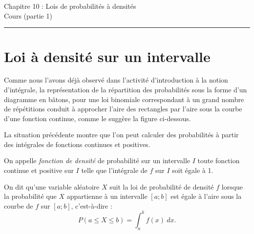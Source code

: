 



 
\chead{} 
\cfoot{}
\renewcommand{\headrulewidth}{0pt}
\renewcommand{\footrulewidth}{0pt}

 \Huge Chapitre 10 : Lois de probabilités à densités\\
 \normalsize Cours (partie 1)\\
 
 \hrule
 
 \vspace{0.5cm}

\section{Loi à densité sur un
intervalle}\label{loi-uxe0-densituxe9-sur-un-intervalle}

Comme nous l'avons déjà observé dans l'activité d'introduction à la
notion d'intégrale, la représentation de la répartition des probabilités
sous la forme d'un diagramme en bâtons, pour une loi binomiale
correspondant à un grand nombre de répétitions conduit à approcher
l'aire des rectangles par l'aire sous la courbe d'une fonction continue,
comme le suggère la figure ci-dessous.

La situation précédente montre que l'on peut calculer des probabilités à
partir des intégrales de fonctions continues et positives.

\vspace{.5cm}

\begin{definition}{}

\begin{dinglist}{43}
\itemsep1pt\parskip0pt
\item
  On appelle \emph{fonction de densité} de probabilité sur un intervalle
  \(I\) toute fonction continue et positive sur \(I\) telle que
  l'intégrale de \(f\) sur \(I\) soit égale à 1.
\item
  On dit qu'une variable aléatoire \(X\) suit la loi de probabilité de
  densité \(f\) lorsque la probabilité que \(X\) appartienne à un
  intervalle \([a;b]\) est égale à l'aire sous la courbe de \(f\) sur
  \([a;b]\), c'est-à-dire
  :\[P(a\leqslant X\leqslant b)=\int_a^bf(x)~dx.\]
\end{dinglist}

\end{definition}


